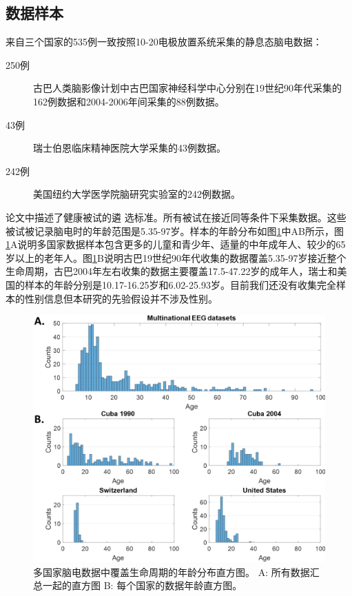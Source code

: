 \subsection{数据样本}
来自三个国家的535例一致按照10-20电极放置系统采集的静息态脑电数据：
\begin{description}
\item[250例] 古巴人类脑影像计划中古巴国家神经科学中心分别在19世纪90年代采集的162例数据和2004-2006年间采集的88例数据。
\item[43例] 瑞士伯恩临床精神医院大学采集的43例数据。
\item[242例] 美国纽约大学医学院脑研究实验室的242例数据。
\end{description}
论文\cite{john1977neurometrics,alvarez1987eeg,koenig2002millisecond,hernandez-gonzalez_multimodal_2011}中描述了健康被试的遴
选标准。所有被试在接近同等条件下采集数据。这些被试被记录脑电时的年龄范围是5.35-97岁。样本的年龄分布如图\ref{6:age}中AB所示，图\ref{6:age}A说明多国家数据样本包含更多的儿童和青少年、适量的中年成年人、较少的65岁以上的老年人。图\ref{6:age}B说明古巴19世纪90年代收集的数据覆盖5.35-97岁接近整个生命周期，古巴2004年左右收集的数据主要覆盖17.5-47.22岁的成年人，瑞士和美国的样本的年龄分别是10.17-16.25岁和6.02-25.93岁。目前我们还没有收集完全样本的性别信息但本研究的先验假设并不涉及性别。
\begin{figure}[!ht]
\includegraphics[width=15cm]{pic/Norm/figure1.png}
\caption{多国家脑电数据中覆盖生命周期的年龄分布直方图。 A: 所有数据汇总一起的直方图 B: 每个国家的数据年龄直方图。}
\label{6:age}
\end{figure}

